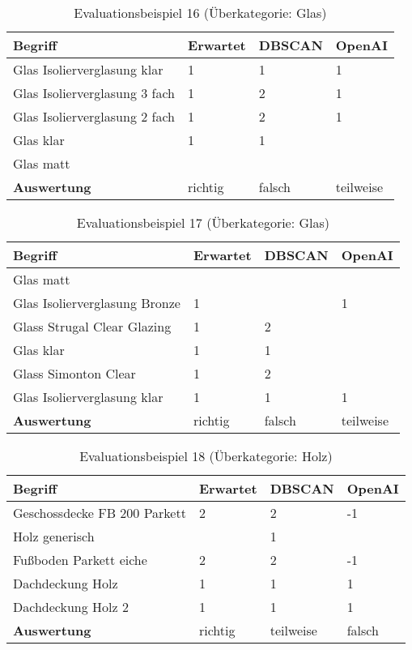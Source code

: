 \begin{table}[h]
	
	\centering
	\begin{tabular}{|l|l|l|l|}
		\hline
		\textbf{Begriff} & \textbf{Erwartet} & \textbf{DBSCAN} & \textbf{OpenAI}\\ \hline
		Glas Isolierverglasung klar & 1 & 1 & 1 \\ \hline
		Glas Isolierverglasung 3 fach & 1 & 2 & 1 \\ \hline
		Glas Isolierverglasung 2 fach & 1 & 2 & 1 \\ \hline
		Glas klar & 1 & 1 & ~ \\ \hline
		Glas matt & ~ & ~ & ~ \\ \hline
		\textbf{Auswertung} & richtig & falsch & teilweise\\ \hline
	\end{tabular}
	\caption{Evaluationsbeispiel 16 (Überkategorie: Glas)}
	\label{t:evaluation-example16}
\end{table}

\begin{table}[h]
	
	\centering
	\begin{tabular}{|l|l|l|l|}
		\hline
		\textbf{Begriff} & \textbf{Erwartet} & \textbf{DBSCAN} & \textbf{OpenAI}\\ \hline
		Glas matt & ~ & ~ & ~ \\ \hline
		Glas Isolierverglasung Bronze & 1 & ~ & 1 \\ \hline
		Glass Strugal Clear Glazing & 1 & 2 & ~ \\ \hline
		Glas klar & 1 & 1 & ~ \\ \hline
		Glass Simonton Clear & 1 & 2 & ~ \\ \hline
		Glas Isolierverglasung klar & 1 & 1 & 1 \\ \hline
		\textbf{Auswertung} & richtig & falsch & teilweise \\ \hline
	\end{tabular}
	\caption{Evaluationsbeispiel 17 (Überkategorie: Glas)}
	\label{t:evaluation-example17}
\end{table}

\begin{table}[h]
	
	\centering
	\begin{tabular}{|l|l|l|l|}
		\hline
		\textbf{Begriff} & \textbf{Erwartet} & \textbf{DBSCAN} & \textbf{OpenAI}\\ \hline
		 Geschossdecke FB 200 Parkett & 2 & 2 & -1 \\ \hline
		 Holz generisch & ~ & 1 & ~ \\ \hline
		 Fußboden Parkett eiche & 2 & 2 & -1 \\ \hline
		 Dachdeckung Holz & 1 & 1 & 1 \\ \hline
		 Dachdeckung Holz 2 & 1 & 1 & 1 \\ \hline
		\textbf{Auswertung} & richtig & teilweise & falsch \\ \hline
	\end{tabular}
	\caption{Evaluationsbeispiel 18 (Überkategorie: Holz)}
	\label{t:evaluation-example18}
\end{table}


